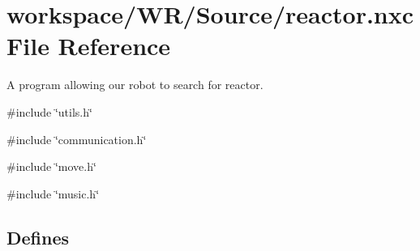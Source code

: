 \hypertarget{reactor_8nxc}{
\section{workspace/WR/Source/reactor.nxc File Reference}
\label{reactor_8nxc}
}


A program allowing our robot to search for reactor.  


{\ttfamily \#include \char`\"{}utils.h\char`\"{}}\par
{\ttfamily \#include \char`\"{}communication.h\char`\"{}}\par
{\ttfamily \#include \char`\"{}move.h\char`\"{}}\par
{\ttfamily \#include \char`\"{}music.h\char`\"{}}\par
\subsection*{Defines}
